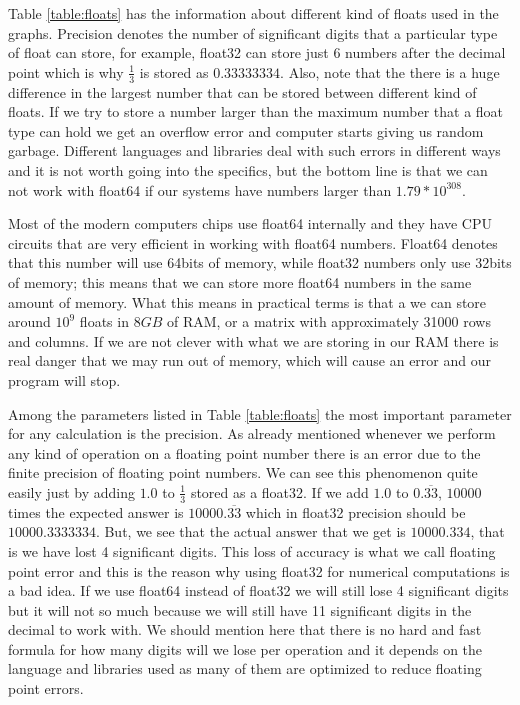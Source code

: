 Table \ref{table:floats} has the information about different kind of floats used in the graphs. Precision denotes the number of significant digits that a particular type of float can store, for example, float32 can store just 6 numbers after the decimal point which is why $\frac{1}{3}$ is stored as $0.33333334$. Also, note that the there is a huge difference in the largest number that can be stored between different kind of floats. If we try to store a number larger than the maximum number that a float type can hold we get an overflow error and computer starts giving us random garbage. Different languages and libraries deal with such errors in different ways and it is not worth going into the specifics, but the bottom line is that we can not work with float64 if our systems have numbers larger than $1.79*10^{308}$.


Most of the modern computers chips use float64 internally and they have CPU circuits that are very efficient in working with float64 numbers. Float64 denotes that this number will use 64bits of memory, while float32 numbers only use 32bits of memory; this means that we can store more float64 numbers in the same amount of memory. What this means in practical terms is that a we can store around $10^9$ floats in $8GB$ of RAM, or a matrix with approximately 31000 rows and columns. If we are not clever with what we are storing in our RAM there is real danger that we may run out of memory, which will cause an error and our program will stop.


Among the parameters listed in Table \ref{table:floats} the most important parameter for any calculation is the precision. As already mentioned whenever we perform any kind of operation on a floating point number there is an error due to the finite precision of floating point numbers.
We can see this phenomenon quite easily just by adding $1.0$ to $\frac{1}{3}$ stored as a float32. If we add $1.0$ to $0.\overline{33}$, $10000$ times the expected answer is $10000.\overline{33}$ which in float32 precision should be $10000.3333334$. But, we see that the actual answer that we get is $10000.334$, that is we have lost 4 significant digits.
This loss of accuracy is what we call floating point error and this is the reason why using float32 for numerical computations is a bad idea. If we use float64 instead of float32 we will still lose 4 significant digits but it will not so much because we will still have 11 significant digits in the decimal to work with. We should mention here that there is no hard and fast formula for how many digits will we lose per operation and it depends on the language and libraries used as many of them are optimized to reduce floating point errors.\label{para:addition_errors}

